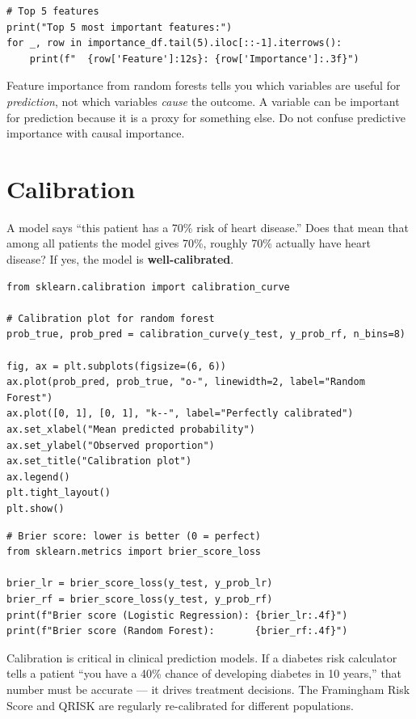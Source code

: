 \begin{verbatim}
# Top 5 features
print("Top 5 most important features:")
for _, row in importance_df.tail(5).iloc[::-1].iterrows():
    print(f"  {row['Feature']:12s}: {row['Importance']:.3f}")
\end{verbatim}

\begin{warningbox}
Feature importance from random forests tells you which variables are useful for \emph{prediction}, not which variables \emph{cause} the outcome. A variable can be important for prediction because it is a proxy for something else. Do not confuse predictive importance with causal importance.
\end{warningbox}

\section{Calibration}

A model says ``this patient has a 70\% risk of heart disease.'' Does that mean that among all patients the model gives 70\%, roughly 70\% actually have heart disease? If yes, the model is \textbf{well-calibrated}.

\begin{verbatim}
from sklearn.calibration import calibration_curve

# Calibration plot for random forest
prob_true, prob_pred = calibration_curve(y_test, y_prob_rf, n_bins=8)

fig, ax = plt.subplots(figsize=(6, 6))
ax.plot(prob_pred, prob_true, "o-", linewidth=2, label="Random Forest")
ax.plot([0, 1], [0, 1], "k--", label="Perfectly calibrated")
ax.set_xlabel("Mean predicted probability")
ax.set_ylabel("Observed proportion")
ax.set_title("Calibration plot")
ax.legend()
plt.tight_layout()
plt.show()
\end{verbatim}

\begin{verbatim}
# Brier score: lower is better (0 = perfect)
from sklearn.metrics import brier_score_loss

brier_lr = brier_score_loss(y_test, y_prob_lr)
brier_rf = brier_score_loss(y_test, y_prob_rf)
print(f"Brier score (Logistic Regression): {brier_lr:.4f}")
print(f"Brier score (Random Forest):       {brier_rf:.4f}")
\end{verbatim}

\begin{clinicalnote}
Calibration is critical in clinical prediction models. If a diabetes risk calculator tells a patient ``you have a 40\% chance of developing diabetes in 10 years,'' that number must be accurate --- it drives treatment decisions. The Framingham Risk Score and QRISK are regularly re-calibrated for different populations.
\end{clinicalnote}

